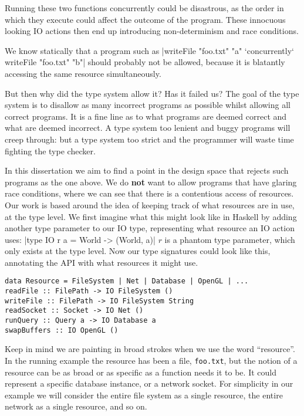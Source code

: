 \documentclass{report}
\begin{document}
Running these two functions concurrently could be disastrous, as the order in
which they execute could affect the outcome of the program. These innocuous
looking IO actions then end up introducing non-determinism and race conditions.
\begin{samepage}
We know statically that a program such as
|writeFile "foo.txt" "a" `concurrently` writeFile "foo.txt" "b"|
\noindent should probably not be allowed, because it is blatantly accessing the
same resource simultaneously.
\end{samepage}
But then why did the type system allow it?  Has it failed us? The goal of the
type system is to disallow as many incorrect programs as possible whilst
allowing all correct programs. It is a fine line as to what programs are
deemed correct and what are deemed incorrect. A type system too lenient and
buggy programs will creep through: but a type system too strict and the
programmer will waste time fighting the type checker.

In this dissertation we aim to find a point in the design space that rejects
such programs as the one above. We do \textbf{not} want to allow programs that
have glaring race conditions, where we can see that there is a contentious
access of resources. Our work is based around the idea of keeping track of what
resources are in use, at the type level. We first imagine what this might look
like in Haskell by adding another type parameter to
our IO type, representing what resource an IO action uses:
|type IO r a = World -> (World, a)|
$r$ is a phantom type parameter, which only exists at the type level. Now our
type signatures could look like this, annotating the API with what resources it
might use.
\begin{verbatim}
data Resource = FileSystem | Net | Database | OpenGL | ...
readFile :: FilePath -> IO FileSystem ()
writeFile :: FilePath -> IO FileSystem String
readSocket :: Socket -> IO Net ()
runQuery :: Query a -> IO Database a
swapBuffers :: IO OpenGL ()
\end{verbatim}

Keep in mind we are painting in broad strokes when we use the word
``resource''. In the running example the resource has been a file,
\texttt{foo.txt}, but the notion of a resource can be as broad or as specific as
a function needs it to be. It could represent a specific database
instance, or a network socket. For simplicity in our example we will
consider the entire file system as a single resource, the entire network as
a single resource, and so on.
\end{document}
